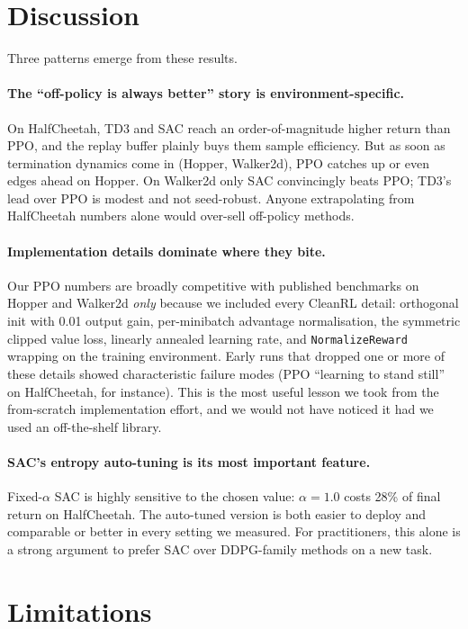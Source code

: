 \documentclass[letterpaper]{article}
\begin{document}
\section{Discussion}

Three patterns emerge from these results.

\paragraph{The ``off-policy is always better'' story is environment-specific.}
On HalfCheetah, TD3 and SAC reach an order-of-magnitude higher return
than PPO, and the replay buffer plainly buys them sample efficiency. But
as soon as termination dynamics come in (Hopper, Walker2d), PPO catches
up or even edges ahead on Hopper. On Walker2d only SAC convincingly beats
PPO; TD3's lead over PPO is modest and not seed-robust. Anyone
extrapolating from HalfCheetah numbers alone would over-sell off-policy
methods.

\paragraph{Implementation details dominate where they bite.}
Our PPO numbers are broadly competitive with published benchmarks on Hopper and Walker2d
\citep{huang2022cleanrl,schulman2017ppo} \emph{only} because we included
every CleanRL detail: orthogonal init with 0.01 output gain, per-minibatch
advantage normalisation, the symmetric clipped value loss, linearly
annealed learning rate, and \texttt{NormalizeReward} wrapping on the
training environment. Early runs that dropped one or more of these
details showed characteristic failure modes (PPO ``learning to stand
still'' on HalfCheetah, for instance). This is the most useful lesson we
took from the from-scratch implementation effort, and we would not have
noticed it had we used an off-the-shelf library.

\paragraph{SAC's entropy auto-tuning is its most important feature.}
Fixed-$\alpha$ SAC is highly sensitive to the chosen value: $\alpha=1.0$
costs 28\% of final return on HalfCheetah. The auto-tuned version is
both easier to deploy and comparable or better in every setting we
measured. For practitioners, this alone is a strong argument to prefer
SAC over DDPG-family methods on a new task.

\section{Limitations}
\end{document}
